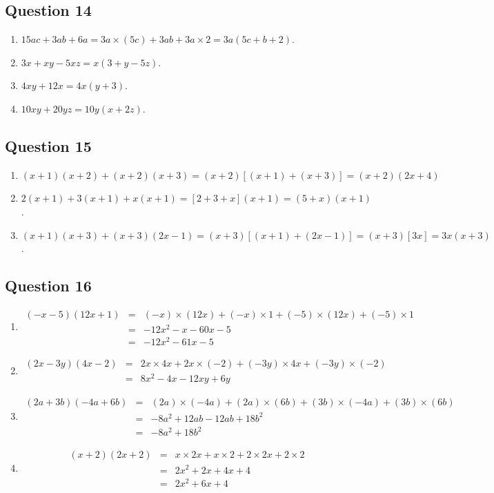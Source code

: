 \documentclass[12 pt]{extarticle}
\theoremstyle{plain}
\begin{document}
\subsection*{Question 14}
\begin{enumerate}
\item $15ac+3ab+6a = 3a\times(5c) + 3a b + 3a \times 2 = 
3a(5c+b+2)$.
\item $3x+xy-5xz = x(3+y-5z)$.
\item $4xy+12x = 4x(y+3)$.
\item $10xy+20yz = 10y(x+2z)$.
\end{enumerate}
\subsection*{Question 15}
\begin{enumerate}
\item $(x+1)(x+2)+(x+2)(x+3) = 
(x+2)[(x+1)+(x+3)]
= (x+2)(2x+4)$
\item $2(x+1) + 3(x+1) + x(x+1) = [2+3+x](x+1) = (5+x)(x+1)$.
\item $(x+1)(x+3)+(x+3)(2x-1) =
(x+3)[(x+1)+(2x-1)] 
= (x+3)[3x] = 3x(x+3)$.
\end{enumerate}
\subsection*{Question 16}
\begin{enumerate}
\item \begin{eqnarray*}(-x-5)(12x+1) &=& (-x)\times(12x) + (-x)\times 1
+ (-5)\times(12x) + (-5) \times 1 \\
&=& -12x^2 -x -60x -5 \\
&=& -12 x^2-61 x -5\end{eqnarray*}
\item \begin{eqnarray*}
(2x-3y)(4x-2) &=& 2x\times 4x + 2x\times (-2) + (-3y) \times 4x + (-3y)\times(-2)\\
&=& 8x^2 - 4x -12xy +6y 
\end{eqnarray*}
\item \begin{eqnarray*}
(2a+3b)(-4a+6b) &=& 
(2a)\times(-4a) + (2a)\times(6b) + (3b)\times(-4a) + (3b)\times (6b) \\
&=& -8a^2 +12ab -12ab + 18b^2 \\
&=& -8a^2+18b^2
\end{eqnarray*}
\item \begin{eqnarray*}
(x+2)(2x+2) &=& 
x\times 2x + x \times 2 + 2 \times 2x + 2 \times 2 \\
&=& 2x^2 + 2x + 4x + 4 \\
&=& 2x^2+6x+4
\end{eqnarray*}
\end{enumerate}
\end{document}
